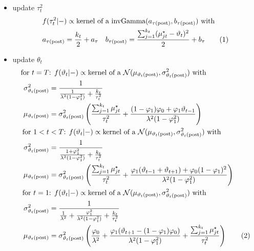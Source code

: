 \documentclass[12pt,	%
	a4paper,		%
	twoside,		%
	openright,		%
	titlepage,%
	]{book}
\newcommand\numberthis{\addtocounter{equation}{1}\tag{\theequation}}
\theoremstyle{definition}
\begin{document}
\begin{itemize}
\item update $\tau^2_t$
\begin{align*}
&f(\tau^2_t|-)\propto \text{kernel of a $\invgamma(a_{\postp{\tau}}, b_{\postp{\tau}})$ with}\\
&a_{\postp{\tau}}=\frac{k_t}{2}+a_\tau \quad
%
b_{\postp{\tau}}= \frac{\sum_{j=1}^{k_t}(\mu_{jt}^\star-\theta_t)^2}{2}+b_\tau
 \numberthis \label{update tau2t}
\end{align*}
    

\item update $\theta_t$
\begin{align*}
    \text{for }t=T &\text{: }
     f(\theta_t|-)\propto \text{kernel of a $\N(\mu_{\postp{\theta_t}},\sigma^2_{\postp{\theta_t}})$ with}\\
    \sigma^2_{\postp{\theta_t}}&=\dfrac{1}{\frac{1}{\lambda^2(1-\phi_1^2)}+\frac{k_t}{\tau_t^2}}\\
    \mu_{\postp{\theta_t}}&=\sigma^2_{\postp{\theta_t}}\left(\frac{\sum_{j=1}^{k_t}\mu^\star_{jt}}{\tau^2_t} + \frac{(1-\phi_1)\phi_0+\phi_1\theta_{t-1}}{\lambda^2(1-\phi_1^2)} \right)\\
\text{for } 1<t&<T \text{: }
     f(\theta_t|-)\propto \text{kernel of a $\N(\mu_{\postp{\theta_t}},\sigma^2_{\postp{\theta_t}})$ with}\\
    \sigma^2_{\postp{\theta_t}}&=\dfrac{1}{\frac{1+\phi_1^2}{\lambda^2(1-\phi_1^2)}+\frac{k_t}{\tau^2_t}}\\
    \mu_{\postp{\theta_t}}&=\sigma^2_{\postp{\theta_t}}\left(\frac{\sum_{j=1}^{k_t}\mu^\star_{jt}}{\tau^2_t} + \frac{\phi_1(\theta_{t-1}+\theta_{t+1}) + \phi_0(1-\phi_1)^2}{\lambda^2(1-\phi_1^2)} \right)\\
    \text{for }t=1 &\text{: }
     f(\theta_t|-)\propto \text{kernel of a $\N(\mu_{\postp{\theta_t}},\sigma^2_{\postp{\theta_t}})$ with}\\
    \sigma^2_{\postp{\theta_t}}&=\dfrac{1}{\frac{1}{\lambda^2}+\frac{\phi_1^2}{\lambda^2(1-\phi_1^2)}+\frac{k_t}{\tau^2_t}}\\
\mu_{\postp{\theta_t}}&=\sigma^2_{\postp{\theta_t}}\left(\frac{\phi_0}{\lambda^2}+\frac{\phi_1(\theta_{t+1}-(1-\phi_1)\phi_0)}{\lambda^2(1-\phi_1^2)}+\frac{\sum_{j=1}^{k_t}\mu^\star_{jt}}{\tau^2_t} \right)
 \numberthis \label{update thetat}
\end{align*}



\end{itemize}
\end{document}
